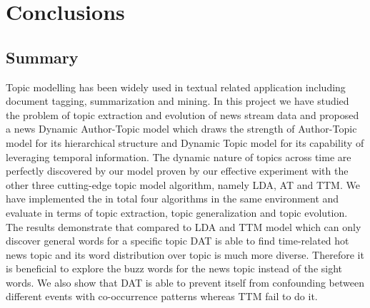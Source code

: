 \chapter{Conclusions}
\label{chapterlabel6}

\section{Summary}
Topic modelling has been widely used in textual related application including document tagging, summarization and mining. In this project we have studied  the problem of topic extraction and evolution of news stream data and proposed a news Dynamic Author-Topic model which draws the strength of Author-Topic model for its hierarchical structure and Dynamic Topic model for its capability of leveraging temporal information. The dynamic nature of topics across time are perfectly discovered by our model proven by our effective experiment with the other three cutting-edge topic model algorithm, namely LDA, AT and TTM. We have implemented the in total four algorithms in the same environment and evaluate in terms of topic extraction, topic generalization and topic evolution. The results demonstrate that compared to LDA and TTM model which can only discover general words for a specific topic DAT is able to find time-related hot news topic and its word distribution over topic is much more diverse. Therefore it is beneficial to explore the buzz words for the news topic instead of the sight words. We also show that DAT is able to prevent itself from confounding between different events with co-occurrence patterns whereas TTM fail to do it. 

